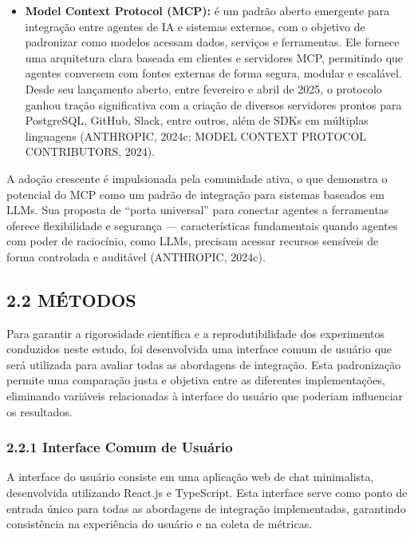 \documentclass[
]{article}
\providecommand{\tightlist}{%
  \setlength{\itemsep}{0pt}\setlength{\parskip}{0pt}}
\begin{document}
\begin{itemize}
\tightlist
\item
  \textbf{Model Context Protocol (MCP):} é um padrão aberto emergente
  para integração entre agentes de IA e sistemas externos, com o
  objetivo de padronizar como modelos acessam dados, serviços e
  ferramentas. Ele fornece uma arquitetura clara baseada em clientes e
  servidores MCP, permitindo que agentes conversem com fontes externas
  de forma segura, modular e escalável. Desde seu lançamento aberto,
  entre fevereiro e abril de 2025, o protocolo ganhou tração
  significativa com a criação de diversos servidores prontos para
  PostgreSQL, GitHub, Slack, entre outros, além de SDKs em múltiplas
  linguagens (ANTHROPIC, 2024c; MODEL CONTEXT PROTOCOL CONTRIBUTORS,
  2024).
\end{itemize}

A adoção crescente é impulsionada pela comunidade ativa, o que demonstra
o potencial do MCP como um padrão de integração para sistemas baseados
em LLMs. Sua proposta de ``porta universal'' para conectar agentes a
ferramentas oferece flexibilidade e segurança --- características
fundamentais quando agentes com poder de raciocínio, como LLMs, precisam
acessar recursos sensíveis de forma controlada e auditável (ANTHROPIC,
2024c).

\subsection{2.2 MÉTODOS}\label{muxe9todos}

Para garantir a rigorosidade científica e a reprodutibilidade dos
experimentos conduzidos neste estudo, foi desenvolvida uma interface
comum de usuário que será utilizada para avaliar todas as abordagens de
integração. Esta padronização permite uma comparação justa e objetiva
entre as diferentes implementações, eliminando variáveis relacionadas à
interface do usuário que poderiam influenciar os resultados.

\subsubsection{2.2.1 Interface Comum de
Usuário}\label{interface-comum-de-usuuxe1rio}

A interface do usuário consiste em uma aplicação web de chat
minimalista, desenvolvida utilizando React.js e TypeScript. Esta
interface serve como ponto de entrada único para todas as abordagens de
integração implementadas, garantindo consistência na experiência do
usuário e na coleta de métricas.
\end{document}
